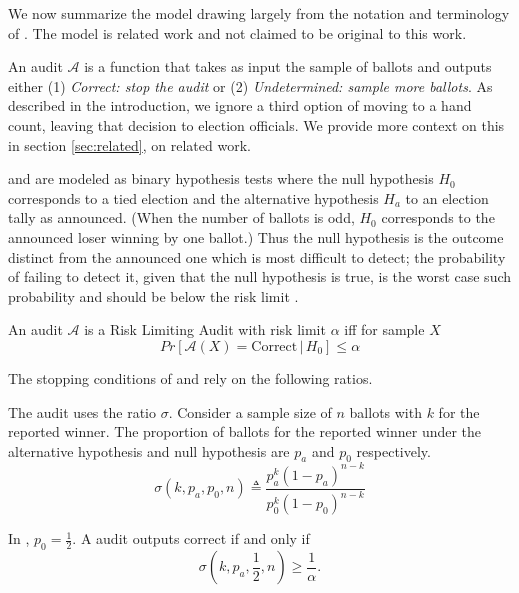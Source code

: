 
We now summarize the model drawing largely from the notation and terminology of \cite{usenix_minerva,arxiv_athena,simulations,bravo}. The model is related work and not claimed to be original to this work. 

An audit $\mathcal{A}$ is a function that takes as input the sample of ballots and outputs either (1) \emph{Correct: stop the audit} or (2) \emph{Undetermined: sample more ballots}. As described in the introduction, we ignore a third option of moving to a hand count, leaving that decision to election officials. We provide more context on this in section \ref{sec:related}, on related work. 

\BRAVO and \Minerva are modeled as binary hypothesis tests where the null hypothesis $H_0$ corresponds to a tied election and the alternative hypothesis $H_a$ to an election tally as announced. 
(When the number of ballots is odd, $H_0$ corresponds to the announced loser winning by one ballot.)
Thus the null hypothesis is the outcome distinct from the announced one which is most difficult to detect; the probability of failing to detect it, given that the null hypothesis is true, is the worst case such probability and should be below the risk limit \cite{Bayesian-RLA}.

\begin{definition}
An audit $\mathcal{A}$ is a Risk Limiting Audit with 
risk limit $\alpha$ iff for sample $X$
$$
Pr[\mathcal{A}(X) 
= \text{Correct} \,|\, H_0]\le \alpha
$$
\end{definition}

The stopping conditions of \BRAVO and \Minerva rely on the following ratios.

\begin{definition} \label{def:bravo-ratio} The \BRAVO audit uses the ratio $\sigma$. Consider a sample size of $n$ ballots with $k$ for the reported winner. The proportion of ballots for the reported winner under the alternative hypothesis and null hypothesis are $p_a$ and $p_0$ respectively.
\begin{equation}
    \sigma(k, p_a, p_0, n) \triangleq \frac{p_a^{k} (1-p_a)^{n-k}}{p_0^{k} (1-p_0)^{n-k}} 
    \label{eqn:bravoratio}
\end{equation}
\end{definition}

In \BRAVO, $p_0=\frac{1}{2}$. A \BRAVO audit outputs correct if and only if
$$\sigma(k,p_a,\frac{1}{2},n)\ge \frac{1}{\alpha}.$$

